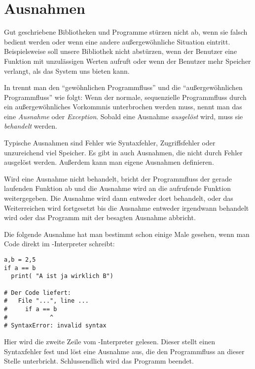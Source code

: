 \section{Ausnahmen}
\label{section:ausnahmen}
Gut geschriebene Bibliotheken und Programme stürzen nicht ab, wenn sie falsch bedient werden oder
wenn eine andere außergewöhnliche Situation eintritt.
Beispielsweise soll unsere  Bibliothek nicht abstürzen, wenn der Benutzer eine Funktion mit unzulässigen Werten aufruft oder
wenn der Benutzer mehr Speicher verlangt, als das System uns bieten kann.

In \Python trennt man den ``gewöhnlichen Programmfluss'' und die ``außergewöhnlichen Programmfluss'' wie folgt:
Wenn der normale, sequenzielle Programmfluss durch ein außergewöhnliches Vorkommnis unterbrochen werden muss, nennt man das eine \emph{Ausnahme} oder \emph{Exception}.
Sobald eine Ausnahme \emph{ausgelöst} wird, muss sie \emph{behandelt} werden.

Typische Ausnahmen sind Fehler wie Syntaxfehler, Zugriffsfehler oder unzureichend viel Speicher.
Es gibt in \Python auch Ausnahmen, die nicht durch Fehler ausgelöst werden.
Außerdem kann man eigene Ausnahmen definieren.

Wird eine Ausnahme nicht behandelt, bricht der Programmfluss der gerade laufenden Funktion ab und die Ausnahme wird an die aufrufende Funktion weitergegeben.
Die Ausnahme wird dann entweder dort behandelt, oder das Weiterreichen wird fortgesetzt bis die Ausnahme entweder irgendwann behandelt wird oder das Programm mit der besagten Ausnahme abbricht.

Die folgende Ausnahme hat man bestimmt schon einige Male gesehen, wenn man Code direkt im \Python-Interpreter schreibt:
\begin{lstlisting}
a,b = 2,5
if a == b
  print( "A ist ja wirklich B")

# Der Code liefert:
#   File "...", line ...
#     if a == b
#            ^
# SyntaxError: invalid syntax
\end{lstlisting}
Hier wird die zweite Zeile vom \Python-Interpreter gelesen.
Dieser stellt einen Syntaxfehler fest und löst eine Ausnahme aus, die den Programmfluss an dieser Stelle unterbricht.
Schlussendlich wird das Programm beendet.




